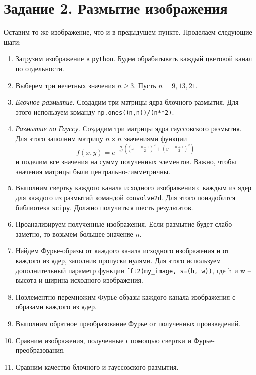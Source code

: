 \documentclass[a4paper, 12pt]{article}
\begin{document}
    \section{Задание 2. Размытие изображения}
    Оставим то же изображение, что и в предыдущем пункте.
    Проделаем следующие шаги:
    \begin{enumerate}
        \item Загрузим изображение в \texttt{python}. Будем обрабатывать каждый цветовой канал по отдельности.
        \item Выберем три нечетных значения $n\geq3$. Пусть $n=9,13,21$.
        \item \textit{Блочное размытие}. Создадим три матрицы ядра блочного размытия. Для этого
        используем команду \texttt{np.ones((n,n))/(n**2)}.
        \item \textit{Размытие по Гауссу}. Cоздадим три матрицы ядра гауссовского размытия. Для
        этого заполним матрицу $n \times n$ значениями функции
        $$
        f(x,y)=e^{-\frac{9}{n^2}\left(\left(x-\frac{n+1}{2}\right)^2+\left(y-\frac{n+1}{2}\right)^2\right)}
        $$
        и поделим все значения на сумму полученных элементов. Важно, чтобы значения матрицы были центрально-симметричны.
        \item Выполним свeртку каждого канала исходного изображения с каждым из ядер для каждого из
        размытий командой \texttt{convolve2d}. Для этого понадобится библиотека \texttt{scipy}. Должно получиться шесть результатов.
        \item Проанализируем полученные изображения. Если размытие будет слабо заметно, то возьмем большее значение $n$.
        \item Найдем Фурье-образы от каждого канала исходного изображения и от каждого из ядер, заполнив пропуски нулями. Для этого используем дополнительный параметр
        функции \texttt{fft2(my\_image, s=(h, w))}, где h и w -- высота и ширина исходного изображения.
        \item Поэлементно перемножим Фурье-образы каждого канала изображения с образами каждого из ядер.
        \item Выполним обратное преобразование Фурье от полученных произведений.
        \item Сравним изображения, полученные с помощью свeртки и Фурье-преобразования.
        \item Сравним качество блочного и гауссовского размытия.
    \end{enumerate}
\end{document}
